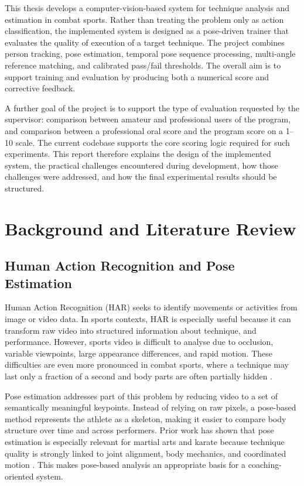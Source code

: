 \documentclass[12pt]{article}
\begin{document}
This thesis develops a computer-vision-based system for technique analysis and estimation in combat sports. Rather than treating the problem only as action classification, the implemented system is designed as a pose-driven trainer that evaluates the quality of execution of a target technique. The project combines person tracking, pose estimation, temporal pose sequence processing, multi-angle reference matching, and calibrated pass/fail thresholds. The overall aim is to support training and evaluation by producing both a numerical score and corrective feedback.

A further goal of the project is to support the type of evaluation requested by the supervisor: comparison between amateur and professional users of the program, and comparison between a professional oral score and the program score on a 1--10 scale. The current codebase supports the core scoring logic required for such experiments. This report therefore explains the design of the implemented system, the practical challenges encountered during development, how those challenges were addressed, and how the final experimental results should be structured.

\section{Background and Literature Review}
\subsection{Human Action Recognition and Pose Estimation}
Human Action Recognition (HAR) seeks to identify movements or activities from image or video data. In sports contexts, HAR is especially useful because it can transform raw video into structured information about technique, and performance. However, sports video is difficult to analyse due to occlusion, variable viewpoints, large appearance differences, and rapid motion. These difficulties are even more pronounced in combat sports, where a technique may last only a fraction of a second and body parts are often partially hidden \cite{wu2024sthka}.

Pose estimation addresses part of this problem by reducing video to a set of semantically meaningful keypoints. Instead of relying on raw pixels, a pose-based method represents the athlete as a skeleton, making it easier to compare body structure over time and across performers. Prior work has shown that pose estimation is especially relevant for martial arts and karate because technique quality is strongly linked to joint alignment, body mechanics, and coordinated motion \cite{echeverria2021pose}. This makes pose-based analysis an appropriate basis for a coaching-oriented system.
\end{document}
